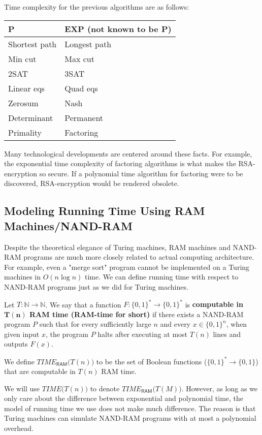 \documentclass{article}
\begin{document}
  Time complexity for the previous algorithms are as follows: 
  \begin{center}
  \begin{tabular}{l|l}
      \textbf{P} & \textbf{EXP} (not known to be \textbf{P}) \\
      \hline
      Shortest path & Longest path \\
      Min cut & Max cut \\
      2SAT & 3SAT \\
      Linear eqs & Quad eqs \\
      Zerosum & Nash \\
      Determinant & Permanent\\
      Primality & Factoring
  \end{tabular}
  \end{center}
  Many technological developments are centered around these facts. For example, the exponential time complexity of factoring algorithms is what makes the RSA-encryption so secure. If a polynomial time algorithm for factoring were to be discovered, RSA-encryption would be rendered obsolete. 

  \subsection{Modeling Running Time Using RAM Machines/NAND-RAM}
  Despite the theoretical elegance of Turing machines, RAM machines and NAND-RAM programs are much more closely related to actual computing architecture. For example, even a "merge sort" program cannot be implemented on a Turing machines in $O(n \log n)$ time. We can define running time with respect to NAND-RAM programs just as we did for Turing machines. 

  \begin{definition}
  Let $T: \mathbb{N} \longrightarrow \mathbb{N}$. We say that a function $F: \{0,1\}^* \longrightarrow \{0,1\}^*$ is \textbf{computable in $\mathbf{T(n)}$ RAM time (RAM-time for short)} if there exists a NAND-RAM program $P$ such that for every sufficiently large $n$ and every $x \in \{0,1\}^n$, when given input $x$, the program $P$ halts after executing at most $T(n)$ lines and outputs $F(x)$. 

  We define $TIME_{\mathsf{RAM}} \big(T(n)\big)$ to be the set of Boolean functions ($\{0,1\}^* \longrightarrow \{0,1\}$) that are computable in $T(n)$ RAM time. 
  \end{definition}

  We will use $TIME \big( T(n)\big)$ to denote $TIME_{\mathsf{RAM}} \big(T(M) \big)$. However, as long as we only care about the difference between exponential and polynomial time, the model of running time we use does not make much difference. The reason is that Turing machines can simulate NAND-RAM programs with at most a polynomial overhead. 
\end{document}
